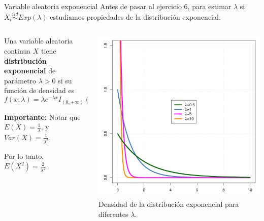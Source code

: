 \documentclass{beamer}
\theoremstyle{definition}
\begin{document}
 
\begin{frame}{\color{rosee}Variable aleatoria exponencial}
Antes de pasar al ejercicio 6, para estimar $\lambda$ si $X_i\stackrel{iid}{\sim}Exp(\lambda)$ estudiamos propiedades de la distribución exponencial.
  \begin{columns}
    \begin{column}[t]{0.48\textwidth}
    \begin{center}
    \vspace{12pt}
          Una variable aleatoria continua $X$ tiene
    \textbf{distribuci\'on exponencial} de par\'ametro $\lambda>0$ si su
    funci\'on de densidad es
    \[f(x;\lambda)=\lambda e^{-\lambda x} I_{(0,+\infty)}(x)\,.\]
  \end{center}
    \textbf{Importante:} Notar que $E(X)=\frac{1}{\lambda}$, y $Var(X)=\frac{1}{\lambda^2}$. 
    
    Por lo tanto, $E(X^2)=\frac{2}{\lambda^2}$.
    \end{column}
    \begin{column}[t]{0.48\textwidth}
      \begin{center}
          \includegraphics[height=.55\textheight]{slides3/img/exponencial.pdf}
          Densidad de la distribuci\'on exponencial para diferentes
      $\lambda$.
      \end{center}
    \end{column}
  \end{columns}
\end{frame}
\end{document}
